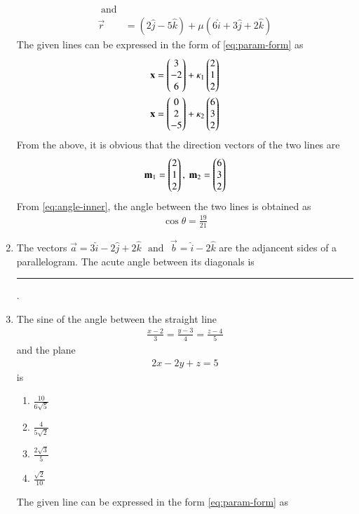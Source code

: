 \begin{enumerate}[label=\thesubsection.\arabic*,ref=\thesubsection.\theenumi]
\begin{align}
	\text{ and}
	\\
	\overrightarrow{r}&=(2\hat{j}-5\hat{k})+\mu(6\hat{i}+3\hat{j}+2\hat{k})
\end{align}
%
\solution  The given lines can be expressed  in the form 
of 
	\eqref{eq:param-form}
	as
\begin{align}
	\mathbf{x} = \begin{pmatrix}3 \\ -2 \\ 6\end{pmatrix} + \kappa_1 \begin{pmatrix}2 \\ 1 \\ 2\end{pmatrix}
	\\
	\mathbf{x} = \begin{pmatrix}0 \\ 2 \\ -5 \end{pmatrix} + \kappa_2 \begin{pmatrix}6 \\ 3 \\ 2\end{pmatrix}
\end{align}
From the above, it is obvious that the direction vectors of the two lines are
\begin{align}
\mathbf{m}_1 =\begin{pmatrix}2 \\ 1 \\ 2\end{pmatrix},\
	\mathbf{m}_2=\begin{pmatrix}6 \\ 3 \\ 2\end{pmatrix}
\end{align}
	From \eqref{eq:angle-inner}, the angle between the two lines is  obtained as
\begin{align}
	\cos \theta = \frac{19}{21}
\end{align}
\item The vectors $\vec{a}=3\hat{i}-2\hat{j}+2\hat{k}$ $\text{ and }$ $\vec{b}=\hat{i}-2\hat{k}$ are the adjancent sides of a parallelogram. The acute angle between its diagonals is \rule{1cm}{0.15mm}.
\item The sine of the angle between the straight line 
\begin{align}
	\frac{x-2}{3}=\frac{y-3}{4}=\frac{z-4}{5} 
\end{align}
and the plane  
\begin{align}
2x-2y+z=5
\end{align}
is
\begin{enumerate}
	\item $\frac{10}{6\sqrt{5}}$ 
	\item $\frac{4}{5\sqrt{2}}$
	\item $\frac{2\sqrt{3}}{5}$
	\item $\frac{\sqrt{2}}{10}$
\end{enumerate}
\solution The given line can be expressed in the form 
	\eqref{eq:param-form}
	as
\begin{align}

\end{align}
\end{enumerate}

